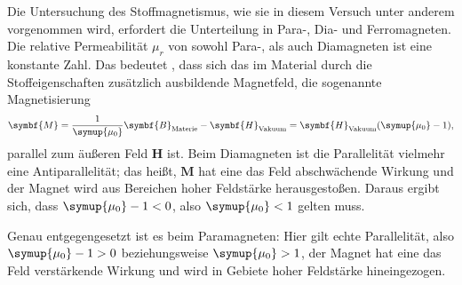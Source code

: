Die Untersuchung des Stoffmagnetismus, wie sie in diesem Versuch unter anderem vorgenommen wird, erfordert die Unterteilung 
in Para-, Dia- und Ferromagneten. 
Die relative Permeabilität $\mu_r$ von sowohl Para-, als auch Diamagneten ist eine konstante Zahl. 
Das bedeutet 
, dass sich das im Material durch die Stoffeigenschaften zusätzlich ausbildende Magnetfeld, die 
sogenannte Magnetisierung 
\begin{equation}
\symbf{M}=\frac{1}{\symup{\mu_0}}\symbf{B}_\text{Materie}-\symbf{H}_\text{Vakuum}=\symbf{H}_\text{Vakuum}(\symup{\mu_0}-1) \text{,} 
\label{eqn:Magnetisierung}
\end{equation}
parallel zum äußeren Feld $\symbf{H}$ ist. 
Beim Diamagneten ist die Parallelität vielmehr eine Antiparallelität; das heißt, $\symbf{M}$ hat eine das Feld
abschwächende Wirkung und der Magnet wird aus Bereichen hoher Feldstärke herausgestoßen. 
Daraus ergibt sich, dass $\symup{\mu_0}-1 < 0$, also $\symup{\mu_0}<1$ gelten muss. 

Genau entgegengesetzt ist es beim Paramagneten: Hier gilt echte Parallelität, also $\symup{\mu_0}-1 > 0$ beziehungsweise 
$\symup{\mu_0}> 1$, der Magnet hat eine das Feld verstärkende Wirkung und wird in Gebiete hoher Feldstärke hineingezogen.

